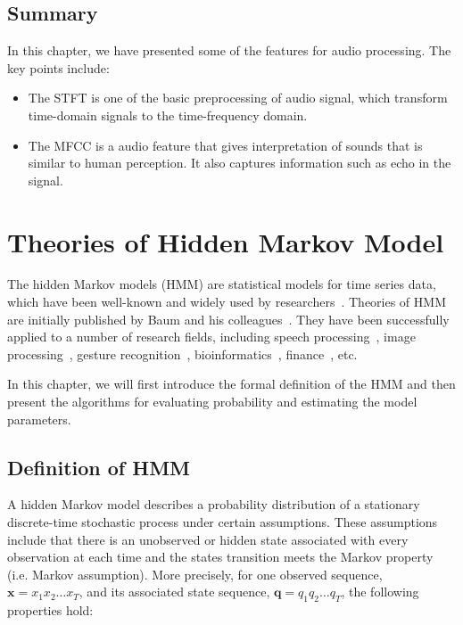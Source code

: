 \documentclass[12pt,final,twoside]{report}
\begin{document}
\section{Summary}
In this chapter, we have presented some of the features for audio processing. The key points include:
\begin{itemize}
  \item The STFT is one of the basic preprocessing of audio signal, which transform time-domain signals to the time-frequency domain.
  \item The MFCC is a audio feature that gives interpretation of sounds that is similar to human perception. It also captures information such as echo in the signal.
\end{itemize}

\cleardoublepage
\chapter{Theories of Hidden Markov Model}
The hidden Markov models (HMM) are statistical models for time series data, which have been well-known and widely used by researchers~\cite{rabiner_tutorial_1989, rabiner_fundamentals_1993}. Theories of HMM are initially published by Baum and his colleagues~\cite{baum_statistical_1966, baum_maximization_1970}. They have been successfully applied to a number of research fields, including speech processing~\cite{baker_dragon_1975, rabiner_fundamentals_1993}, image processing~\cite{chen_off-line_1994}, gesture recognition~\cite{mitra_gesture_2007}, bioinformatics~\cite{koski_hidden_2001}, finance~\cite{bhar_hidden_2004}, etc.

In this chapter, we will first introduce the formal definition of the HMM and then present the algorithms for evaluating probability and estimating the model parameters.

\section{Definition of HMM} \label{sec:hmm}
A hidden Markov model describes a probability distribution of a stationary discrete-time stochastic process under certain assumptions. These assumptions include that there is an unobserved or hidden state associated with every observation at each time and the states transition meets the Markov property (i.e. Markov assumption). More precisely, for one observed sequence, $\mathbf{x} = x_1 x_2 \dots x_T$, and its associated state sequence, $\mathbf{q} = q_1 q_2 \dots q_T$, the following properties hold:
\end{document}
